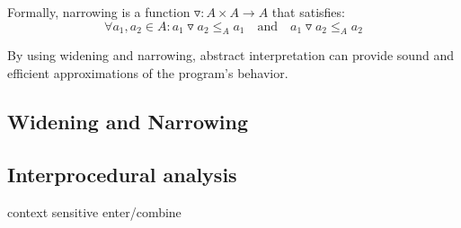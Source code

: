   Formally, narrowing is a function \(\triangledown: A \times A \to A\) that satisfies:
  \[ \forall a_1, a_2 \in A: a_1 \triangledown a_2 \leq_A a_1 \quad \text{and} \quad a_1 \triangledown a_2 \leq_A a_2 \]

By using widening and narrowing, abstract interpretation can provide sound and efficient approximations of the program's behavior.

\subsection{Widening and Narrowing}

\subsection{Interprocedural analysis}

context sensitive
enter/combine



